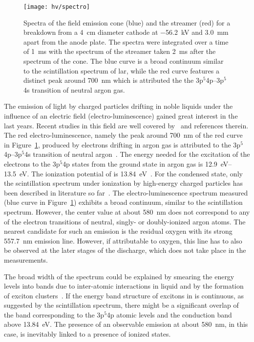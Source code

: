 \begin{figure}[htb]
	\centering
	\texttt{[image: hv/spectro]}
	\caption[ test field emission and streamer spectra]{%
		Spectra of the field emission cone (blue) and the streamer (red) for a breakdown from a \SI{4}{\centi\metre} diameter cathode at \SI{-56.2}{\kilo\volt} and \SI{3.0}{\milli\metre} apart from the anode plate.
		The spectra were integrated over a time of \SI{1}{\milli\second} with the spectrum of the streamer taken \SI{2}{\milli\second} after the spectrum of the cone.
		The blue curve is a broad continuum similar to the scintillation spectrum of \acrshort{lar}, while the red curve features a distinct peak around \SI{700}{\nano\metre} which is attributed the the 3p$^5$4p--3p$^5$4s transition of neutral argon gas.
	}
	\label{fig:hv_spectro}
\end{figure}

The emission of light by charged particles drifting in noble liquids under the influence of an electric field (electro-luminescence) gained great interest in the last years.
Recent studies in this field are well covered by~\cite{buzulutskov1, buzulutskov2, buzulutskov3} and references therein.
The red electro-luminescence, namely the peak around \SI{700}{\nano\metre} of the red curve in Figure~\ref{fig:hv_spectro}, produced by electrons drifting in argon gas is attributed to the 3p$^5$4p--3p$^5$4s transition of neutral argon~\cite{Boffard}.
The energy needed for the excitation of the electrons to the 3p$^5$4p states from the ground state in argon gas is \SIrange{12.9}{13.5}{\electronvolt}.
The ionization potential of \lar{} is \SI{13.84}{\electronvolt}~\cite{2photonAbs}.
For the condensed state, only the scintillation spectrum under ionization by high-energy charged particles has been described in literature so far~\cite{Heindl}.
The electro-luminescence spectrum measured (blue curve in Figure~\ref{fig:hv_spectro}) exhibits a broad continuum, similar to the scintillation spectrum.
However, the center value at about \SI{580}{\nano\metre} does not correspond to any of the electron transitions of neutral, singly- or doubly-ionized argon atoms.
The nearest candidate for such an emission is the residual oxygen with its strong \SI{557.7}{\nano\metre} emission line.
However, if attributable to oxygen, this line has to also be observed at the later stages of the discharge, which does not take place in the measurements.

The broad width of the spectrum could be explained by smearing the energy levels into bands due to inter-atomic interactions in liquid and by the formation of exciton clusters~\cite{Bernstorff, Foerstel}.
If the energy band structure of excitons in \lar{} is continuous, as suggested by the scintillation spectrum, there might be a significant overlap of the band corresponding to the 3p$^5$4p atomic levels and the conduction band above \SI{13.84}{\electronvolt}.
The presence of an observable emission at about \SI{580}{\nano\metre}, in this case, is inevitably linked to a presence of ionized states.

